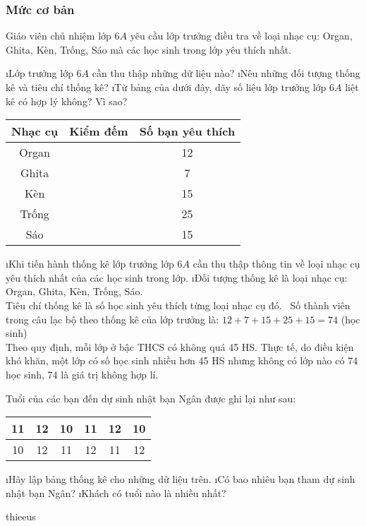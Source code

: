 \subsubsection*{Mức cơ bản}
\begin{bt}
	Giáo viên chủ nhiệm lớp $6A$ yêu cầu lớp trưởng điều tra về loại nhạc cụ: Organ, Ghita, Kèn, Trống, Sáo mà các học sinh trong lớp yêu thích nhất.
	\begin{enumerate}[a),leftmargin=*]
		\i Lớp trưởng lớp $6A$ cần thu thập những dữ liệu nào? 
		\i Nêu những đối tượng thống kê và tiêu chí thống kê?
		\i Từ bảng của dưới đây, dãy số liệu lớp trưởng lớp $6A$ liệt kê có hợp lý không? Vì sao?
	\end{enumerate}
	\begin{center}
		\begin{tabular}{|c|c|c|}
			\hline
			Nhạc cụ	 &Kiểm đếm	&Số bạn yêu thích\\
			\hline
			Organ &	& 12\\
			\hline	 
			Ghita & & 7 \\
			\hline	 
			Kèn	& & 15 \\
			\hline
			Trống & & 25 \\
			\hline	 
			Sáo	& & 15 \\
			\hline
		\end{tabular}
	\end{center}
	\begin{loigiaichuong39}
		\begin{enumerate}[a),leftmargin=*]
			\i Khi tiến hành thống kê lớp trưởng lớp  $6A$ cần thu thập thông tin về loại nhạc cụ yêu thích nhất của các học sinh trong lớp.
			\i Đối tượng thống kê là  loại nhạc cụ: Organ, Ghita, Kèn, Trống, Sáo.\\
			Tiêu chí thống kê là số học sinh yêu thích từng loại nhạc cụ đó.
			\ Số thành viên trong câu lạc bộ theo thống kê của lớp trưởng là: $12 + 7+ 15 +25 +15 = 74$ (học sinh)\\ 
			Theo quy định, mỗi lớp ở bậc THCS có không quá 45 HS. Thực tế, do điều kiện khó khăn, một lớp có số học sinh nhiều hơn 45 HS nhưng không có lớp nào có 74 học sinh,  74 là giá trị không hợp lí.
		\end{enumerate}
	\end{loigiaichuong39}
\end{bt}
\begin{bt}
	Tuổi của các bạn đến dự sinh nhật bạn Ngân được ghi lại như sau:
	\begin{center}
		\begin{tabular}{|c|c|c|c|c|c|}
			\hline
			11&	12&	10&	11&	12&	10\\
			\hline
			10&	12&	11&	12&	11&	12\\
			\hline
		\end{tabular}
	\end{center}
	\begin{enumerate}[a),leftmargin=*]
		\i Hãy lập bảng thống kê cho những dữ liệu trên.
		\i Có bao nhiêu bạn tham dự sinh nhật bạn Ngân?
		\i Khách có tuổi nào là nhiều nhất?
	\end{enumerate}
	\begin{loigiaichuong39}
		thieeus
	\end{loigiaichuong39}
\end{bt}
